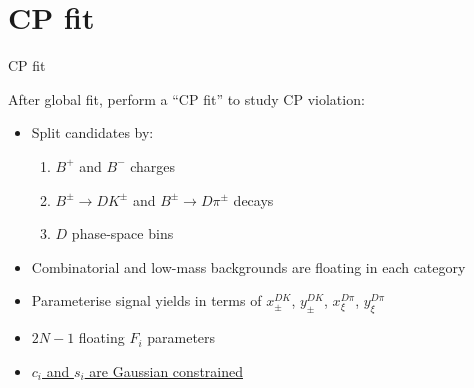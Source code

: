 \documentclass[xcolor={dvipsnames}]{beamer}
\begin{document}
\section{CP fit}
\begin{frame}{CP fit}
  \begin{center}
    {\large After global fit, perform a ``CP fit'' to study CP violation:}
  \end{center}
  \begin{itemize}
    \setlength\itemsep{1.0em}
    \item{Split candidates by:}
    \begin{enumerate}
      \item{$B^+$ and $B^-$ charges}
      \item{$B^\pm\to DK^\pm$ and $B^\pm\to D\pi^\pm$ decays}
      \item{$D$ phase-space bins}
    \end{enumerate}
    \item{Combinatorial and low-mass backgrounds are floating in each category}
    \item{Parameterise signal yields in terms of $x_\pm^{DK}$, $y_\pm^{DK}$, $x_\xi^{D\pi}$, $y_\xi^{D\pi}$}
    \item{$2N - 1$ floating $F_i$ parameters}
    \item{\underline{$c_i$ and $s_i$ are Gaussian constrained}}
  \end{itemize}
\end{frame}
\end{document}
